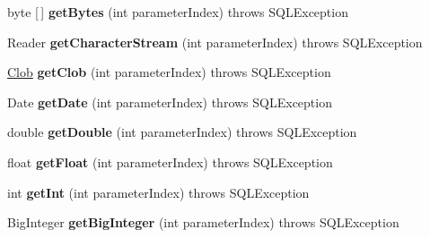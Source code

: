 \begin{DoxyCompactItemize}
byte \mbox{[}$\,$\mbox{]} {\bfseries get\+Bytes} (int parameter\+Index)  throws S\+Q\+L\+Exception
\item 
\mbox{\label{interfacecom_1_1mysql_1_1cj_1_1jdbc_1_1_parameter_bindings_a0d60a9da60310e6edba977bcb821936b}} 
Reader {\bfseries get\+Character\+Stream} (int parameter\+Index)  throws S\+Q\+L\+Exception
\item 
\mbox{\label{interfacecom_1_1mysql_1_1cj_1_1jdbc_1_1_parameter_bindings_ab571246dfa58b9015a37d38ae9f9d963}} 
\mbox{\hyperlink{classcom_1_1mysql_1_1cj_1_1jdbc_1_1_clob}{Clob}} {\bfseries get\+Clob} (int parameter\+Index)  throws S\+Q\+L\+Exception
\item 
\mbox{\label{interfacecom_1_1mysql_1_1cj_1_1jdbc_1_1_parameter_bindings_acd82f7279a45dfadbd44bda480635097}} 
Date {\bfseries get\+Date} (int parameter\+Index)  throws S\+Q\+L\+Exception
\item 
\mbox{\label{interfacecom_1_1mysql_1_1cj_1_1jdbc_1_1_parameter_bindings_acb4404a1a457887b9f9043e2fbe49271}} 
double {\bfseries get\+Double} (int parameter\+Index)  throws S\+Q\+L\+Exception
\item 
\mbox{\label{interfacecom_1_1mysql_1_1cj_1_1jdbc_1_1_parameter_bindings_aabaf3ac29ee4abce6ccbc91b57d1af6c}} 
float {\bfseries get\+Float} (int parameter\+Index)  throws S\+Q\+L\+Exception
\item 
\mbox{\label{interfacecom_1_1mysql_1_1cj_1_1jdbc_1_1_parameter_bindings_a7e64ab7c86c8de5512e53311efe3e4ab}} 
int {\bfseries get\+Int} (int parameter\+Index)  throws S\+Q\+L\+Exception
\item 
\mbox{\label{interfacecom_1_1mysql_1_1cj_1_1jdbc_1_1_parameter_bindings_afb97e0615a81251b6b33822cc3651f3d}} 
Big\+Integer {\bfseries get\+Big\+Integer} (int parameter\+Index)  throws S\+Q\+L\+Exception
\item 

\end{DoxyCompactItemize}
